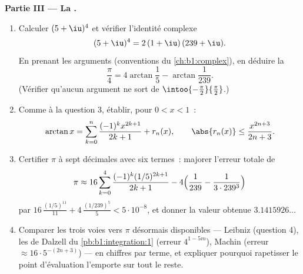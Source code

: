 \begin{problem}
\medskip
\noindent\textbf{Partie III --- La .}
\begin{enumerate}[resume]
  \item Calculer $(5 + \iu)^4$ et vérifier l'identité complexe
        \[
        (5 + \iu)^4 = 2\,(1 + \iu)\,(239 + \iu) .
        \]
        En prenant les arguments (conventions du
        \cref{ch:b1:complex}), en déduire la 
        \[
        \frac\pi4 = 4\arctan\frac15 - \arctan\frac{1}{239} .
        \]
        (Vérifier qu'aucun argument ne sort de
        $\intoo{-\frac\pi2}{\frac\pi2}$.)
  \item Comme à la question 3, établir, pour $0 < x < 1$~:
        \[
        \arctan x = \sum_{k=0}^{n} \frac{(-1)^k
        x^{2k+1}}{2k+1} + r_n(x), \qquad \abs{r_n(x)} \leq
        \frac{x^{2n+3}}{2n+3} .
        \]
  \item Certifier $\pi$ à sept décimales avec six termes~: majorer
        l'erreur totale de
        \[
        \pi \approx 16\sum_{k=0}^{4}
        \frac{(-1)^k (1/5)^{2k+1}}{2k+1}
        - 4\Bigl(\frac{1}{239} - \frac{1}{3\cdot239^3}\Bigr)
        \]
        par $16\,\frac{(1/5)^{11}}{11} +
        4\,\frac{(1/239)^5}{5} < 5\cdot10^{-8}$, et donner la
        valeur obtenue $3.1415926\dots$
  \item Comparer les trois voies vers $\pi$ désormais disponibles
        --- Leibniz (question 4), les  de Dalzell du
        \cref{pb:b1:integration:1} (erreur $4^{1-5m}$), Machin
        (erreur $\approx 16\cdot 5^{-(2n+3)}$) --- en chiffres par
        terme, et expliquer pourquoi rapetisser le point
        d'évaluation l'emporte sur tout le reste.
\end{enumerate}


\end{problem}
